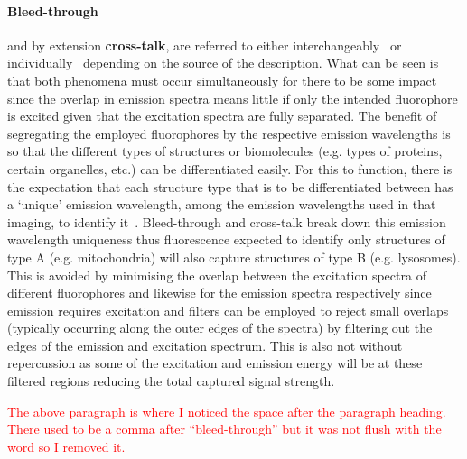 \paragraph{Bleed-through} and by extension \textbf{cross-talk}, are referred to either interchangeably~\cite{Sanderson-2014} or individually~\cite{Bolte-2006} depending on the source of the description. What can be seen is that both phenomena must occur simultaneously for there to be some impact since the overlap in emission spectra means little if only the intended fluorophore is excited given that the excitation spectra are fully separated. The benefit of segregating the employed fluorophores by the respective emission wavelengths is so that the different types of structures or biomolecules (e.g. types of proteins, certain organelles, etc.) can be differentiated easily. For this to function, there is the expectation that each structure type that is to be differentiated between has a `unique' emission wavelength, among the emission wavelengths used in that imaging, to identify it~\cite{Bolte-2006}. Bleed-through and cross-talk break down this emission wavelength uniqueness thus fluorescence expected to identify only structures of type A (e.g. mitochondria) will also capture structures of type B (e.g. lysosomes). This is avoided by minimising the overlap between the excitation spectra of different fluorophores and likewise for the emission spectra respectively since emission requires excitation and filters can be employed to reject small overlaps (typically occurring along the outer edges of the spectra) by filtering out the edges of the emission and excitation spectrum. This is also not without repercussion as some of the excitation and emission energy will be at these filtered regions reducing the total captured signal strength.\par
\textcolor{red}{The above paragraph is where I noticed the space after the paragraph heading. There used to be a comma after ``bleed-through'' but it was not flush with the word so I removed it.}
